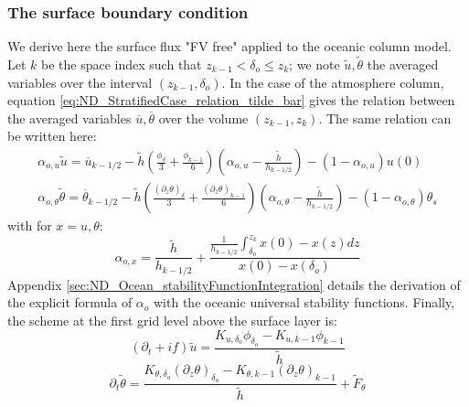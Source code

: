 \subsubsection{The surface boundary condition}
We derive here the surface flux "FV free" applied to the oceanic
column model. Let $k$ be the space index such that
$z_{k-1} < \delta_o \leq z_k$;
we note $\widetilde{u}, \widetilde{\theta}$
the averaged variables over the interval $(z_{k-1}, \delta_o)$.
In the case of the atmosphere column, equation
\eqref{eq:ND_StratifiedCase_relation_tilde_bar}
gives the relation between the averaged variables
$\overline{u}, \overline{\theta}$ over the volume $(z_{k-1}, z_{k})$.
The same relation can be written here:
\begin{equation}
\begin{aligned}
\label{eq:ND_Ocean_relation_tilde_bar}
\alpha_{o, u}\widetilde{u} = \overline{u}_{k-1/2} -
\widetilde{h}
	\left(\frac{\phi_{\delta}}{3} + \frac{\phi_{k-1}}{6}\right)
	\left(\alpha_{o, u} - \frac{\widetilde{h}}{h_{k-1/2}}\right)
	- (1 - \alpha_{o, u})u(0)\\
\alpha_{o, \theta}
\widetilde{\theta}
= \overline{\theta}_{k-1/2} -
	\widetilde{h}\left(\frac{{(\partial_z \theta)}_{\delta}}{3}
	+ \frac{{(\partial_z \theta)}_{k-1}}{6}\right)
	\left(\alpha_{o, \theta}-\frac{\widetilde{h}}{h_{k-1/2}}\right)
 - (1 - \alpha_{o, \theta})\theta_s
\end{aligned}
\end{equation}
with for $x = u, \theta$:
\begin{equation}
	\alpha_{o, x} = \frac{\widetilde{h}}{h_{k-1/2}} +
	\frac{\frac{1}{{h_{k-1/2}}}\int_{\delta_{o}}^{z_k} x(0) - x(z)
	dz}{x(0) - x(\delta_{o})}
\end{equation}
Appendix \ref{sec:ND_Ocean_stabilityFunctionIntegration}
details the derivation of the explicit formula of $\alpha_{o}$
with the oceanic universal stability functions.
Finally, the scheme at the first grid level above
the surface layer is:
\begin{equation}
	\label{eq:ND_Ocean_semiDiscreteEkmanEqFVfree}
	(\partial_t+if) \widetilde{u}
	= \frac{K_{u, \delta_o}\phi_{\delta_o}
	- K_{u,k-1} \phi_{k-1}}{\widetilde{h}}
\end{equation}
\begin{equation}
	\label{eq:ND_Ocean_semiDiscreteEkmanEqPTFVfree}
	\partial_t \widetilde{\theta}
	= \frac{K_{\theta, \delta_o}{(\partial_z \theta)}_{\delta_o} -
	K_{\theta,k-1} {(\partial_z \theta)}_{k-1}}{\widetilde{h}}
	+ \widetilde{F}_\theta 
\end{equation}
